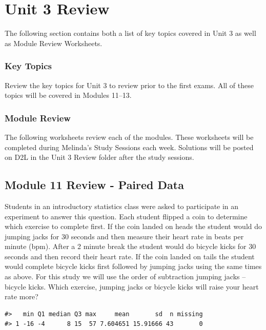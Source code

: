 \documentclass[
]{report}
\begin{document}
\newpage

\chapter{Unit 3 Review}\label{unit-3-review}

The following section contains both a list of key topics covered in Unit 3 as well as Module Review Worksheets.

\subsection{Key Topics}\label{key-topics}

Review the key topics for Unit 3 to review prior to the first exams. All of these topics will be covered in Modules 11--13.

\subsection{Module Review}\label{module-review}


The following worksheets review each of the modules. These worksheets will be completed during Melinda's Study Sessions each week. Solutions will be posted on D2L in the Unit 3 Review folder after the study sessions.

\newpage

\section{Module 11 Review - Paired Data}\label{module-11-review---paired-data}

Students in an introductory statistics class were asked to participate in an experiment to answer this question. Each student flipped a coin to determine which exercise to complete first. If the coin landed on heads the student would do jumping jacks for 30 seconds and then measure their heart rate in beats per minute (bpm). After a 2 minute break the student would do bicycle kicks for 30 seconds and then record their heart rate. If the coin landed on tails the student would complete bicycle kicks first followed by jumping jacks using the same times as above. For this study we will use the order of subtraction jumping jacks -- bicycle kicks. Which exercise, jumping jacks or bicycle kicks will raise your heart rate more?

\begin{verbatim}
#>   min Q1 median Q3 max     mean       sd  n missing
#> 1 -16 -4      8 15  57 7.604651 15.91666 43       0
\end{verbatim}
\end{document}
